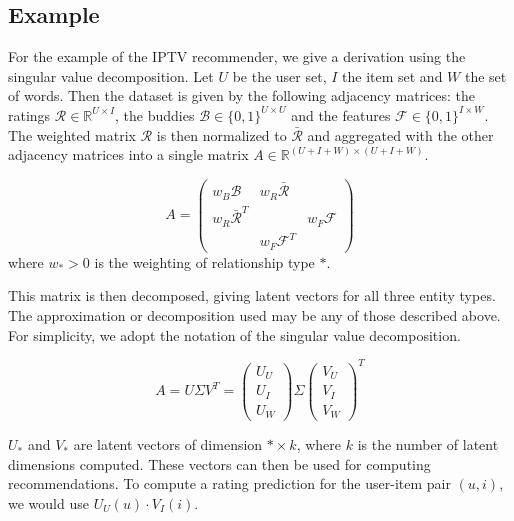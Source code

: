 \documentclass{article}
\begin{document}
\subsection{Example}

For the example of the IPTV recommender, we give a derivation using the
singular value decomposition.  Let $U$ be the user set, $I$ the item set
and $W$ the set of words.  Then the dataset is given by the following adjacency
matrices:  the ratings $\mathcal{R} \in \mathbb{R}^{U\times I}$, the
buddies $\mathcal{B} \in \{0,1\}^{U \times U}$ and the features
$\mathcal{F} \in \{0,1\}^{I\times W}$.  The weighted matrix $\mathcal R$
is then normalized to $\bar{\mathcal R}$ and aggregated with the other
adjacency matrices into a single matrix $A \in \mathbb R ^{(U+I+W)\times(U+I+W)}$.

\begin{displaymath}
  A = \begin{pmatrix} 
    w_B \mathcal B & w_R \bar{\mathcal R} & \\ w_R \bar{\mathcal R}^T &
      & w_F \mathcal F \\ & w_F \mathcal F^T & 
    \end{pmatrix}
\end{displaymath}
where $w_* > 0$ is the weighting of relationship type $*$. 

This matrix is then decomposed, giving latent vectors for all three
entity types.  The approximation or decomposition used may be any of
those described above.  For simplicity, we adopt the notation of the
singular value decomposition. 

\begin{displaymath}
  A = U \Sigma V^T = \begin{pmatrix} U_U \\ U_I \\ U_W \end{pmatrix}
  \Sigma \begin{pmatrix} V_U \\ V_I \\ V_W \end{pmatrix}^T 
\end{displaymath}

$U_*$ and $V_*$ are latent vectors of dimension $*\times k$, where $k$ is
the number of latent dimensions computed.  These vectors can then be used for
computing recommendations.  To compute a rating prediction for the
user-item pair $(u,i)$, we would use $U_U(u) \cdot V_I(i)$.  
\end{document}
